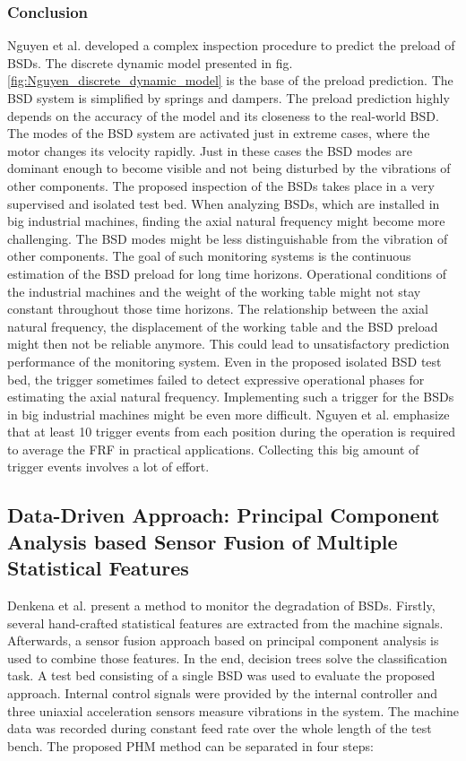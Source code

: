 \subsubsection{Conclusion}
Nguyen et al. \cite{NGUYEN2019} developed a complex inspection procedure to predict the preload of BSDs. The discrete dynamic model presented in fig. \ref{fig:Nguyen_discrete_dynamic_model} is the base of the preload prediction. The BSD system is simplified by springs and dampers. The preload prediction highly depends on the accuracy of the model and its closeness to the real-world BSD. The modes of the BSD system are activated just in extreme cases, where the motor changes its velocity rapidly. Just in these cases the BSD modes are dominant enough to become visible and not being disturbed by the vibrations of other components. The proposed inspection of the BSDs takes place in a very supervised and isolated test bed. When analyzing BSDs, which are installed in big industrial machines, finding the axial natural frequency might become more challenging. The BSD modes might be less distinguishable from the vibration of other components. The goal of such monitoring systems is the continuous estimation of the BSD preload for long time horizons. Operational conditions of the industrial machines and the weight of the working table might not stay constant throughout those time horizons. The relationship between the axial natural frequency, the displacement of the working table and the BSD preload might then not be reliable anymore. This could lead to unsatisfactory prediction performance of the monitoring system. Even in the proposed isolated BSD test bed, the trigger sometimes failed to detect expressive operational phases for estimating the axial natural frequency. Implementing such a trigger for the BSDs in big industrial machines might be even more difficult. Nguyen et al. emphasize that at least 10 trigger events from each position during the operation is required to average the FRF in practical applications. Collecting this big amount of trigger events involves a lot of effort. 

\subsection{Data-Driven Approach: Principal Component Analysis based Sensor Fusion of Multiple Statistical Features}

Denkena et al. \cite{Denkena2021} present a method to monitor the degradation of BSDs. Firstly, several hand-crafted statistical features are extracted from the machine signals. Afterwards, a sensor fusion approach based on principal component analysis is used to combine those features. In the end, decision trees solve the classification task. A test bed consisting of a single BSD was used to evaluate the proposed approach. Internal control signals were provided by the internal controller and three uniaxial acceleration sensors measure vibrations in the system. The machine data was recorded during constant feed rate over the whole length of the test bench. The proposed PHM method can be separated in four steps:

